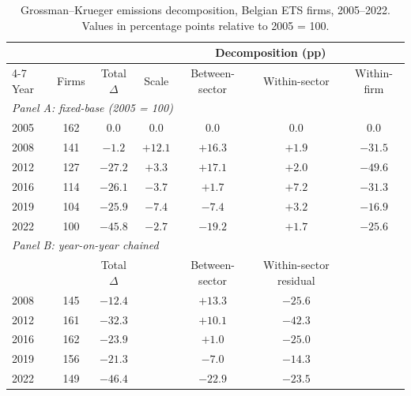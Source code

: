\begin{table}[H]
\centering
\caption{Grossman--Krueger emissions decomposition, Belgian ETS firms, 2005--2022.\\
\footnotesize Values in percentage points relative to 2005 = 100.}
\label{tab:gk_decomp}
\begin{tabular}{lcccccc}
\toprule
 & & & \multicolumn{4}{c}{Decomposition (pp)} \\
 \cmidrule(lr){4-7}
Year & Firms & Total $\Delta$ & Scale & Between-sector & Within-sector & Within-firm \\
\midrule
\multicolumn{7}{l}{\emph{Panel A: fixed-base (2005 = 100)}} \\
2005 & 162 &   0.0 &   0.0 &   0.0 & 0.0 &   0.0 \\
2008 & 141 &  $-1.2$ &  $+12.1$ &  $+16.3$ & $+1.9$ & $-31.5$ \\
2012 & 127 & $-27.2$ &  $+3.3$  &  $+17.1$ & $+2.0$ & $-49.6$ \\
2016 & 114 & $-26.1$ & $-3.7$  &  $+1.7$  & $+7.2$ & $-31.3$ \\
2019 & 104 & $-25.9$ & $-7.4$  & $-7.4$   & $+3.2$ & $-16.9$ \\
2022 & 100 & $-45.8$ & $-2.7$  & $-19.2$  & $+1.7$ & $-25.6$ \\
\midrule
\multicolumn{7}{l}{\emph{Panel B: year-on-year chained}} \\
 & & Total $\Delta$ & & Between-sector & Within-sector residual & \\
2008 & 145 & $-12.4$ & & $+13.3$ & $-25.6$ & \\
2012 & 161 & $-32.3$ & & $+10.1$ & $-42.3$ & \\
2016 & 162 & $-23.9$ & & $+1.0$ & $-25.0$ & \\
2019 & 156 & $-21.3$ & & $-7.0$ & $-14.3$ & \\
2022 & 149 & $-46.4$ & & $-22.9$ & $-23.5$ & \\
\bottomrule
\end{tabular}
\end{table}

